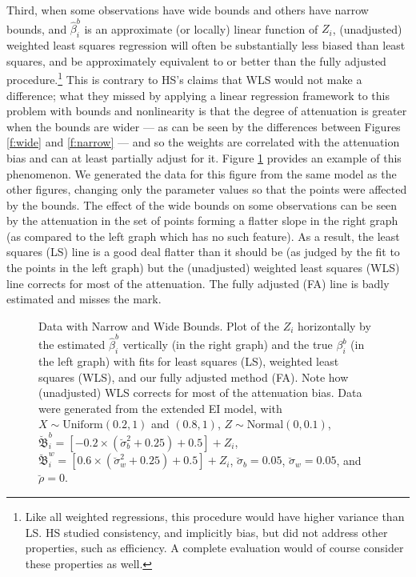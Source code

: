 \documentclass[11pt,titlepage]{article}
\newcommand{\bbeta}{{\mathfrak B}}
\newcommand{\sigmau}{\breve{\sigma}}
\newcommand{\rhou}{\breve{\rho}}
\begin{document}
Third, when some observations have wide bounds and others have narrow
bounds, and $\hat\beta_i^b$ is an approximate (or locally) linear
function of $Z_i$, (unadjusted) weighted least squares regression will
often be substantially less biased than least squares, and be
approximately equivalent to or better than the fully adjusted
procedure.\footnote{Like all weighted regressions, this procedure
  would have higher variance than LS. HS studied consistency, and
  implicitly bias, but did not address other properties, such as
  efficiency.  A complete evaluation would of course consider these
  properties as well.}  This is contrary to HS's claims that WLS would
not make a difference; what they missed by applying a linear
regression framework to this problem with bounds and nonlinearity is
that the degree of attenuation is greater when the bounds are wider
--- as can be seen by the differences between Figures \ref{f:wide} and
\ref{f:narrow} --- and so the weights are correlated with the
attenuation bias and can at least partially adjust for it.  Figure
\ref{f:mixed} provides an example of this phenomenon.  We generated
the data for this figure from the same model as the other figures,
changing only the parameter values so that the points were affected by
the bounds.  The effect of the wide bounds on some observations can be
seen by the attenuation in the set of points forming a flatter slope
in the right graph (as compared to the left graph which has no such
feature).  As a result, the least squares (LS) line is a good deal
flatter than it should be (as judged by the fit to the points in the
left graph) but the (unadjusted) weighted least squares (WLS) line
corrects for most of the attenuation.  The fully adjusted (FA) line is
badly estimated and misses the mark.
\begin{figure}[t]
  \begin{center}
    \caption{Data with Narrow and Wide Bounds. Plot of the $Z_i$ 
      horizontally by the estimated $\hat\beta_i^b$ vertically (in the
      right graph) and the true $\beta_i^b$ (in the left graph) with
      fits for least squares (LS), weighted least squares (WLS), and
      our fully adjusted method (FA).  Note how (unadjusted) WLS
      corrects for most of the attenuation bias.  Data were generated
      from the extended EI model, with $X \sim
      \textrm{Uniform}(0.2,1)$ and $(0.8,1)$, $Z \sim
      \textrm{Normal}(0,0.1)$, $\breve\bbeta_i^b = [-0.2 \times
      (\sigmau_b^2 + 0.25) + 0.5] + Z_i$, $\breve\bbeta_i^w = [0.6
      \times (\sigmau_w^2 + 0.25) + 0.5] + Z_i$, $\sigmau_b = 0.05$,
      $\sigmau_w = 0.05$, and $\rhou = 0$.}
    \label{f:mixed}
  \end{center}
\end{figure}
\end{document}

